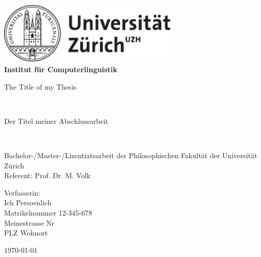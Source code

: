 \begin{titlepage}
\includegraphics[height=30mm]{images/uzh_logo_d_pos}\\ \vspace{2cm} \hspace{3cm}
 \Large \textbf{Institut f\"ur Computerlinguistik}

\begin{center}

\begin{Huge}The Title of my Thesis\end{Huge}\\
\begin{Large}Der Titel meiner Abschlussarbeit\end{Large}\\

\vspace{2cm}

\vfill {\Large Bachelor-/Master-/Lizentiatsarbeit der Philosophischen Fakultät der Universität Zürich \\ \vspace{1cm} Referent: Prof. Dr. M. Volk}

\vspace{3cm}

\large Verfasserin: \\
	Ich Persoenlich \\ 
	Matrikelnummer 12-345-678 \\
	Meinestrasse Nr \\
	PLZ Wohnort
\vspace{1cm}

\vfill {\large \today}
\vspace{3cm}
\end{center}

\end{titlepage}

\newpage
